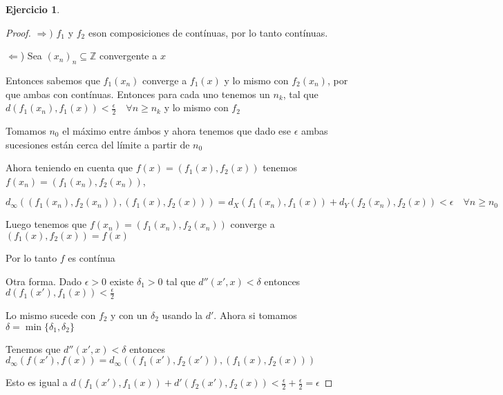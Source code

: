 \documentclass[11pt]{report}
\newcommand{\Z}{\mathbb{Z}}
\newcommand{\Ra}{\Rightarrow}
\theoremstyle{definition}
\newtheorem{ej}{Ejercicio}
\begin{document}
\begin{ej}
\begin{enumerate}
				\begin{proof}
					$\Ra )$ $f_1$ y $f_2$ eson composiciones de contínuas, por lo tanto contínuas.

					$\Leftarrow$) Sea $(x_n)_n \subseteq \Z$ convergente a $x$ 

					Entonces sabemos que $f_1(x_n)$ converge a $f_1(x)$ y lo mismo con $f_2(x_n)$, por que ambas con contínuas. Entonces para cada uno tenemos un $n_k$, tal que $d(f_1(x_n),f_1(x)) < \frac{\epsilon}{2} \quad \forall n \geq n_k$ y lo mismo con $f_2$

					Tomamos $n_0$ el máximo entre ámbos y ahora tenemos que dado ese $\epsilon$ ambas sucesiones están cerca del límite a partir de $n_0$

					Ahora teniendo en cuenta que $f(x) = (f_1(x),f_2(x)) $ tenemos $f(x_n) = (f_1(x_n),f_2(x_n))$, 

					$d_{\infty}((f_1(x_n),f_2(x_n)),(f_1(x),f_2(x))) = d_X(f_1(x_n),f_1(x)) + d_Y(f_2(x_n),f_2(x)) < \epsilon \quad \forall n\geq n_0$

					Luego tenemos que $f(x_n) = (f_1(x_n),f_2(x_n))$ converge a $(f_1(x),f_2(x)) =  f(x)$

					Por lo tanto $f$ es contínua

					Otra forma. Dado $\epsilon >0$ existe $\delta_1 > 0 $ tal que $d''(x',x) < \delta $ entonces $d(f_1(x'),f_1(x)) < \frac{\epsilon}{2}$

					
					Lo mismo sucede con $f_2$ y con un $\delta_2$ usando la $d'$. Ahora si tomamos $\delta = \min\{\delta_1,\delta_2\}$

					Tenemos que $d''(x',x) < \delta$ entonces $d_{\infty}(f(x'),f(x)) = d_{\infty}((f_1(x'),f_2(x')),(f_1(x),f_2(x)))$ 

					Esto es igual a $d(f_1(x'),f_1(x)) + d'(f_2(x'),f_2(x)) < \frac{\epsilon}{2} + \frac{\epsilon}{2} = \epsilon$
				\end{proof}
				
				
		\end{enumerate}
	\end{ej}
	
\end{document}
